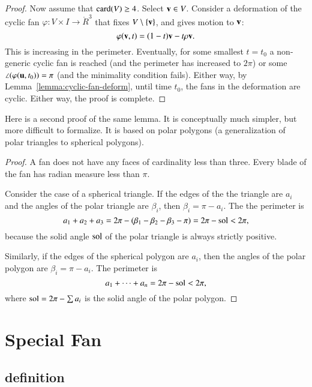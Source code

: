 \begin{proof}
Now assume that ${\operatorname{card}}(V)\ge 4$.  Select ${\mathbf v}\in V$.  Consider a deformation of the cyclic fan $\varphi:V\times I \to \ring{R}^3$ that fixes $V\setminus\{{\mathbf v}\}$, and gives motion to ${\mathbf v}$:
$$
\varphi({\mathbf v},t) = (1-t) {\mathbf v} - t \rho {\mathbf v}.
$$
This is increasing in the perimeter.    Eventually, for some smallest $t=t_0$ a non-generic cyclic fan is reached (and the perimeter has increased to $2\pi$) or some $\angle(\varphi({\mathbf u},t_0))=\pi$ (and the minimality condition fails).  Either way, by Lemma~\ref{lemma:cyclic-fan-deform}, until time $t_0$, the fans in the deformation are cyclic.  Either way, the proof is complete. 
\end{proof}

Here is a second proof of the same lemma.  It is conceptually much simpler, but more difficult to formalize.  It is based on polar polygons (a generalization of polar triangles to spherical polygons).

\begin{proof} A fan does not have any faces of cardinality less than three.
Every blade of the fan has radian measure less than $\pi$.  
%

Consider the case of a spherical triangle.  If the edges of the
the triangle are $a_i$ and the angles of the polar
triangle are $\beta_i$, then $\beta_i=\pi-a_i$.
The the perimeter is 
$$a_1+a_2+a_3 = 2\pi - (\beta_1 -\beta_2 - \beta_3-\pi)= 2\pi-{\operatorname{sol}} < 2\pi,$$
because the solid angle ${\operatorname{sol}}$ of the polar triangle is always strictly positive.
%

Similarly, if the edges of the spherical polygon are
$a_i$, then the angles of the polar polygon are $\beta_i = \pi-a_i$.
The perimeter is
$$
a_1+\cdots+a_n  = 2\pi- {\operatorname{sol}}< 2\pi,
$$
where ${\operatorname{sol}} = 2\pi-\sum a_i$ is the solid angle of the polar polygon.
%
\end{proof}


\section{Special Fan}\label{sec:weight}  






\subsection{definition}
%

